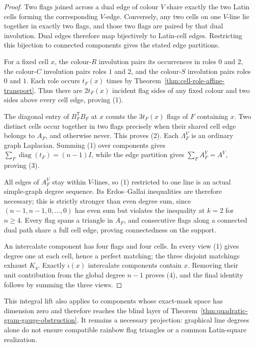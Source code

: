 \begin{proof}
Two flags joined across a dual edge of colour $V$ share exactly the two Latin
cells forming the corresponding $V$-edge.  Conversely, any two cells on one
$V$-line lie together in exactly two flags, and those two flags are paired by
that dual involution.  Dual edges therefore map bijectively to Latin-cell
edges.  Restricting this bijection to connected components gives the stated
edge partitions.

For a fixed cell $x$, the colour-$R$ involution pairs its occurrences in
roles $0$ and $2$, the colour-$C$ involution pairs roles $1$ and $2$, and the
colour-$S$ involution pairs roles $0$ and $1$.  Each role occurs $t_F(x)$
times by Theorem~\ref{thm:cell-role-affine-transport}.  Thus there are
$2t_F(x)$ incident flag sides of any fixed colour and two sides above every
cell edge, proving (1).

The diagonal entry of $B_F^{\mathsf T}B_F$ at $x$ counts the
$3t_F(x)$ flags of $F$ containing $x$.  Two distinct cells occur together in
two flags precisely when their shared cell edge belongs to $A_F$, and
otherwise never.  This proves (2).  Each $\Lambda_F^V$ is an ordinary graph
Laplacian.  Summing (1) over components gives
$\sum_F\operatorname{diag}(t_F)=(n-1)I$, while the edge partition gives
$\sum_FA_F^V=A^V$, proving (3).

All edges of $A_F^V$ stay within $V$-lines, so (1) restricted to one line is
an actual simple-graph degree sequence.  Its Erdos--Gallai inequalities are
therefore necessary; this is strictly stronger than even degree sum, since
$(n-1,n-1,0,\ldots,0)$ has even sum but violates the inequality at $k=2$
for $n\geq4$.  Every flag spans a triangle in $A_F$, and consecutive flags
along a connected dual path share a full cell edge, proving connectedness on
the support.

An intercalate component has four flags and four cells.  In every view (1)
gives degree one at each cell, hence a perfect matching; the three disjoint
matchings exhaust $K_4$.  Exactly $\iota(x)$ intercalate components contain
$x$.  Removing their unit contribution from the global degree $n-1$ proves
(4), and the final identity follows by summing the three views.
\end{proof}

This integral lift also applies to components whose exact-mask space has
dimension zero and therefore reaches the blind layer of
Theorem~\ref{thm:quadratic-gram-gauge-obstruction}.  It remains a necessary
projection: graphical line degrees alone do not ensure compatible rainbow
flag triangles or a common Latin-square realization.

